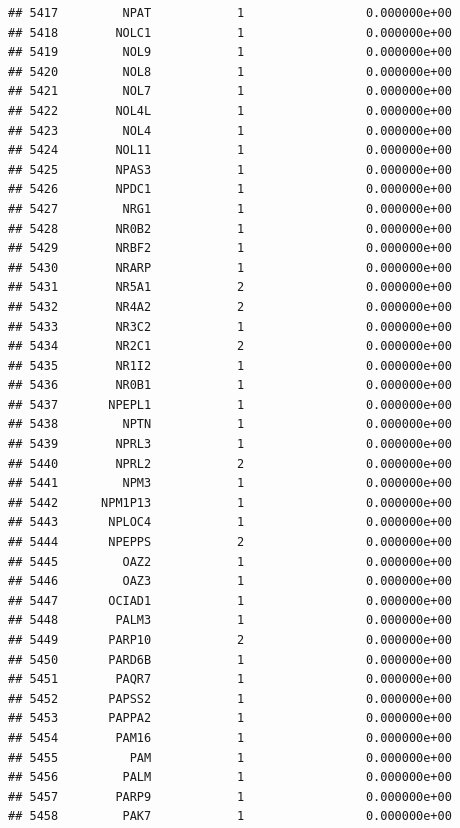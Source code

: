 \documentclass[
]{article}
\begin{document}
\begin{verbatim}
## 5417         NPAT            1                 0.000000e+00
## 5418        NOLC1            1                 0.000000e+00
## 5419         NOL9            1                 0.000000e+00
## 5420         NOL8            1                 0.000000e+00
## 5421         NOL7            1                 0.000000e+00
## 5422        NOL4L            1                 0.000000e+00
## 5423         NOL4            1                 0.000000e+00
## 5424        NOL11            1                 0.000000e+00
## 5425        NPAS3            1                 0.000000e+00
## 5426        NPDC1            1                 0.000000e+00
## 5427         NRG1            1                 0.000000e+00
## 5428        NR0B2            1                 0.000000e+00
## 5429        NRBF2            1                 0.000000e+00
## 5430        NRARP            1                 0.000000e+00
## 5431        NR5A1            2                 0.000000e+00
## 5432        NR4A2            2                 0.000000e+00
## 5433        NR3C2            1                 0.000000e+00
## 5434        NR2C1            2                 0.000000e+00
## 5435        NR1I2            1                 0.000000e+00
## 5436        NR0B1            1                 0.000000e+00
## 5437       NPEPL1            1                 0.000000e+00
## 5438         NPTN            1                 0.000000e+00
## 5439        NPRL3            1                 0.000000e+00
## 5440        NPRL2            2                 0.000000e+00
## 5441         NPM3            1                 0.000000e+00
## 5442      NPM1P13            1                 0.000000e+00
## 5443       NPLOC4            1                 0.000000e+00
## 5444       NPEPPS            2                 0.000000e+00
## 5445         OAZ2            1                 0.000000e+00
## 5446         OAZ3            1                 0.000000e+00
## 5447       OCIAD1            1                 0.000000e+00
## 5448        PALM3            1                 0.000000e+00
## 5449       PARP10            2                 0.000000e+00
## 5450       PARD6B            1                 0.000000e+00
## 5451        PAQR7            1                 0.000000e+00
## 5452       PAPSS2            1                 0.000000e+00
## 5453       PAPPA2            1                 0.000000e+00
## 5454        PAM16            1                 0.000000e+00
## 5455          PAM            1                 0.000000e+00
## 5456         PALM            1                 0.000000e+00
## 5457        PARP9            1                 0.000000e+00
## 5458         PAK7            1                 0.000000e+00

\end{verbatim}
\end{document}
